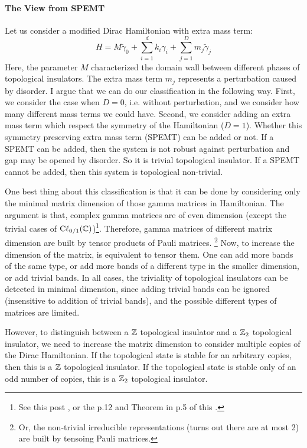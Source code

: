 \documentclass{article}
\begin{document}
\paragraph{The View from SPEMT} Let us consider a modified Dirac Hamiltonian
with extra mass term:
\begin{equation}
    \label{eq:H-spemt}
    H = M\tilde{\gamma}_0 + \sum_{i=1}^{d} k_i \gamma_i 
    + \sum_{j=1}^D m_j\tilde{\gamma}_j
\end{equation}
Here, the parameter $M$ characterized the domain wall between different phases
of topological insulators. The extra mass term $m_j$ represents a perturbation
caused by disorder. I argue that we can do our classification in the following
way. First, we consider the case when $D=0$, i.e. without perturbation, and we
consider how many different mass terms we could have. Second, we consider adding
an extra mass term which respect the symmetry of the Hamiltonian ($D=1$).
Whether this symmetry preserving extra mass term (SPEMT) can be added or not. If
a SPEMT can be added, then the system is not robust against perturbation and gap
may be opened by disorder. So it is trivial topological insulator. If a SPEMT
cannot be added, then this system is topological non-trivial. 

One best thing about this classification is that it can be done by considering
only the minimal matrix dimension of those gamma matrices in Hamiltonian. The
argument is that, complex gamma matrices are of even dimension (except the
trivial cases of $\mathrm{C\ell}_{0/1}(\mathbb{C})$)\footnote{See this post
\cite{PhysicsStackExchange}, or the p.12 and Theorem in p.5 of this
\cite{West1998}.}. Therefore, gamma matrices of different
matrix dimension are built by tensor products of Pauli matrices.
\footnote{Or, the non-trivial irreducible representations (turns out there are
at most 2) are built by tensoing Pauli matrices.}
Now, to increase the dimension of the matrix, is equivalent to
tensor them. One can add more bands of the same type, or add more bands of a
different type in the smaller dimension, or add trivial bands. In all cases, the
triviality of topological insulators can be detected in minimal dimension, since
adding trivial bands can be ignored (insensitive to addition of trivial bands),
and the possible different types of matrices are limited.

However, to distinguish between a $\mathbb{Z}$ topological insulator and a $\mathbb{Z}_2$
topological insulator, we need to increase the matrix dimension to consider
multiple copies of the Dirac Hamiltonian. If the topological state is stable for
an arbitrary copies, then this is a $\mathbb{Z}$ topological insulator. If the
topological state is stable only of an odd number of copies, this is a $\mathbb{Z}_2$
topological insulator.
\end{document}
